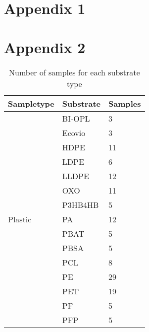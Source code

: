 \chapter{Appendix 1}
\label{appendix:studies}


\chapter{Appendix 2}


\begin{table}[H]
\caption{Number of samples for each substrate type}
\label{substrate_sampletype}
\begin{tabular}{@{}lll@{}}
\toprule
\textbf{Sampletype}           & \textbf{Substrate} & \textbf{Samples} \\ \midrule
\multirow{26}{*}{Plastic}     & BI-OPL             & 3          \\
                              & Ecovio             & 3          \\
                              & HDPE               & 11         \\
                              & LDPE               & 6          \\
                              & LLDPE              & 12         \\
                              & OXO                & 11         \\
                              & P3HB4HB            & 5          \\
                              & PA                 & 12         \\
                              & PBAT               & 5          \\
                              & PBSA               & 5          \\
                              & PCL                & 8          \\
                              & PE                 & 29         \\
                              & PET                & 19         \\
                              & PF                 & 5          \\
                              & PFP                & 5          \\

\end{tabular}
\end{table}
